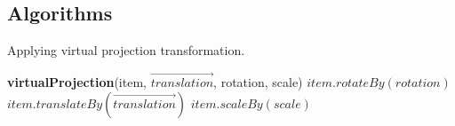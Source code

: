 \documentclass{bmcart}
\newcommand{\INDSTATE}[1][1]{\STATE\hspace{#1\algorithmicindent}}
\begin{document}
\begin{backmatter}





\pagebreak
\section*{Algorithms}

\begin{algorithm}[h!]
\caption{Applying virtual projection transformation.}
\label{algo:virtualProjection}
\begin{algorithmic}
\STATE \textbf{virtualProjection}(item, $\overrightarrow{translation}$, rotation, scale)
\INDSTATE[2]$item.rotateBy(rotation)$
\INDSTATE[2]$item.translateBy(\overrightarrow{translation})$
\INDSTATE[2]$item.scaleBy(scale)$
\end{algorithmic}
\end{algorithm}


\end{backmatter}
\end{document}
